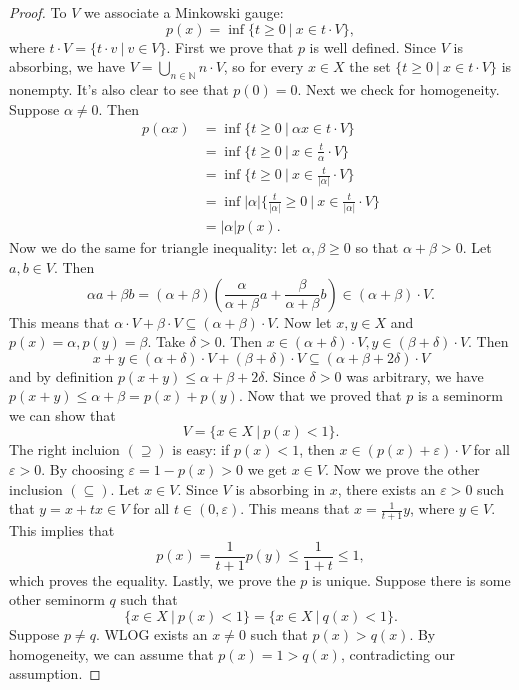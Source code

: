 \documentclass[10pt, a4paper]{article}
\newenvironment{noticeC}{%
  \tcolorbox[%
  notitle,
  empty,
  enhanced,  %
  breakable,
  coltext=black, 
  fontupper=\rmfamily,
  noparskip,
  sharp corners,
  boxrule=-1pt,  %
  frame hidden,
  left=7pt,  %
  right=7pt,
  top=5pt,
  bottom=5pt,
  before skip=2.5ex plus 2pt,
  after skip=2.5ex plus 2pt,
  overlay unbroken and last={%
  },
  ]}
{\endtcolorbox}
\newenvironment{myproof}%
  {\begin{noticeC}\begin{proof}}%
  {\end{proof}\end{noticeC}}
\newcommand{\N}{\mathbb {N}}
\begin{document}
\begin{myproof}
  To $V$ we associate a Minkowski gauge:
  $$p(x) = \inf \{t \geq 0\ |\ x \in t \cdot V\},$$
  where $t \cdot V = \{t \cdot v\ |\ v \in V\}$.
  First we prove that $p$ is well defined.
  Since $V$ is absorbing, we have $V = \bigcup_{n \in \N} n \cdot V$,
  so for every $x \in X$ the set $\{t \geq 0\ |\ x \in t \cdot V\}$
  is nonempty. It's also clear to see that $p(0) = 0$.
  Next we check for homogeneity. Suppose $\alpha \neq 0$.
  Then 
  \begin{align*}
    p(\alpha x) &= \inf \{t \geq 0\ |\ \alpha x \in t\cdot V\}\\
    &= \inf \{t \geq 0\ |\ x \in \frac{t}{\alpha}\cdot V\}\\
    &= \inf \{t \geq 0\ |\ x \in \frac{t}{|\alpha|}\cdot V\}\\
    &= \inf |\alpha| \{\frac{t}{|\alpha|} \geq 0\ |\ x \in \frac{t}{|\alpha|}\cdot V\}\\
    &= |\alpha| p(x).
  \end{align*}
  Now we do the same for triangle inequality:
  let $\alpha, \beta \geq 0$ so that $\alpha + \beta > 0$.
  Let $a, b \in V$. Then 
  $$\alpha a + \beta b = (\alpha + \beta) \left(\frac{\alpha}{\alpha + \beta} a + \frac{\beta}{\alpha + \beta} b\right) \in (\alpha + \beta) \cdot V.$$
  This means that $\alpha \cdot V + \beta \cdot V \subseteq (\alpha + \beta) \cdot V$.
  Now let $x, y \in X$ and $p(x) = \alpha, p(y) = \beta$.
  Take $\delta > 0$. Then $x \in (\alpha + \delta) \cdot V, y \in (\beta + \delta) \cdot V$.
  Then $$x + y \in (\alpha + \delta) \cdot V + (\beta + \delta) \cdot V \subseteq (\alpha + \beta + 2 \delta) \cdot V$$
  and by definition $p(x + y) \leq \alpha + \beta + 2 \delta$.
  Since $\delta > 0$ was arbitrary, we have $p(x + y) \leq \alpha + \beta = p(x) + p(y)$.
  Now that we proved that $p$ is a seminorm we can show that 
  $$V = \{x \in X\ |\ p(x) < 1\}.$$
  The right incluion $(\supseteq)$ is easy: if $p(x) < 1$, then $x \in (p(x) + \varepsilon) \cdot V$
  for all $\varepsilon > 0$. By choosing $\varepsilon = 1 - p(x) > 0$ we get $x \in V$.
  Now we prove the other inclusion $(\subseteq)$. Let $x \in V$.
  Since $V$ is absorbing in $x$, there exists an $\varepsilon > 0$ such that 
  $y = x + tx \in V$ for all $t \in (0, \varepsilon)$. This means that $x = \frac{1}{t + 1} y$, where $y \in V$.
  This implies that 
  $$p(x) = \frac{1}{t + 1} p(y) \leq \frac{1}{1 + t} \leq 1,$$
  which proves the equality. Lastly, we prove the $p$ is unique.
  Suppose there is some other seminorm $q$ such that 
  $$\{x \in X\ |\ p(x) < 1\} = \{x \in X\ |\ q(x) < 1\}.$$
  Suppose $p \neq q$. WLOG exists an $x \neq 0$ such that $p(x) > q(x)$.
  By homogeneity, we can assume that $p(x) = 1 > q(x)$, contradicting our assumption.
\end{myproof}
\end{document}
